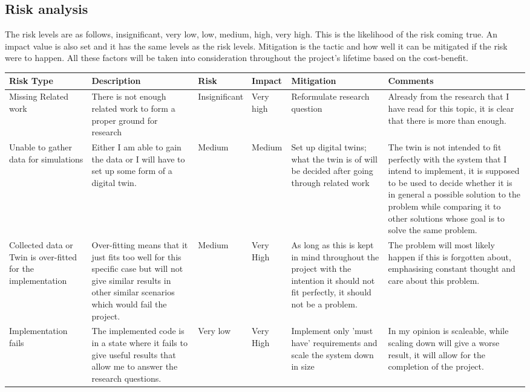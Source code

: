 \documentclass[a4paper,8pt]{article}
\begin{document}
		\subsection{Risk analysis}
			The risk levels are as follows, insignificant, very low, low, medium, high, very high. This is the likelihood of the risk coming true. An impact value is also set and it has the same levels as the risk levels. Mitigation is the tactic and how well it can be mitigated if the risk were to happen. All these factors will be taken into consideration throughout the project's lifetime based on the cost-benefit.
			{\scriptsize
			\begin{center}
				\begin{tabular}[!h]{|m{8em}|m{6em}|m{5em}|m{5em}|m{5em}|m{9em}|}
					\hline
					Risk Type & Description & Risk & Impact & Mitigation & Comments \\ \hline
					Missing Related work & There is not enough related work to form a proper ground for research & Insignificant & Very high & Reformulate research question & Already from the research that I have read for this topic, it is clear that there is more than enough. \\ \hline
					Unable to gather data for simulations & Either I am able to gain the data or I will have to set up some form of a digital twin. & Medium & Medium & Set up digital twins; what the twin is of will be decided after going through related work & The twin is not intended to fit perfectly with the system that I intend to implement, it is supposed to be used to decide whether it is in general a possible solution to the problem while comparing it to other solutions whose goal is to solve the same problem.\\ \hline
					Collected data or Twin is over-fitted for the implementation & Over-fitting means that it just fits too well for this specific case but will not give similar results in other similar scenarios which would fail the project. & Medium & Very High & As long as this is kept in mind throughout the project with the intention it should not fit perfectly, it should not be a problem. & The problem will most likely happen if this is forgotten about, emphasising constant thought and care about this problem. \\ \hline
					Implementation fails & The implemented code is in a state where it fails to give useful results that allow me to answer the research questions. & Very low & Very High & Implement only 'must have' requirements and scale the system down in size & In my opinion is scaleable, while scaling down will give a worse result, it will allow for the completion of the project. \\ \hline
				\end{tabular}
			\end{center}
			}
		\begin{figure}[tbp]
			\begin{center}
			\end{center}

		\end{figure}
	\printbibliography
	
	
\end{document}

